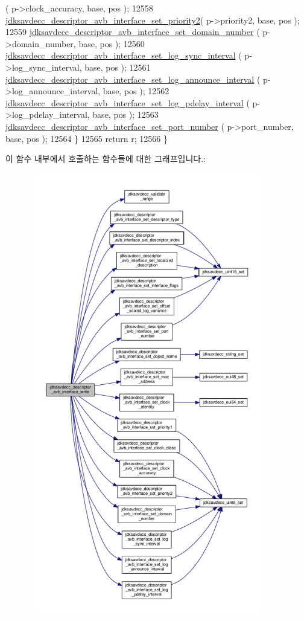 \begin{DoxyCode}
      ( p->clock\_accuracy, base, pos );
12558         \hyperlink{group__descriptor__avb__interface_ga3c7cf7ee22623519b430421f9f3d21ac}{jdksavdecc\_descriptor\_avb\_interface\_set\_priority2}(
       p->priority2, base, pos );
12559         \hyperlink{group__descriptor__avb__interface_ga8cbb9a1d823c845467459787ed0cf496}{jdksavdecc\_descriptor\_avb\_interface\_set\_domain\_number}
      ( p->domain\_number, base, pos );
12560         \hyperlink{group__descriptor__avb__interface_ga94084d67afa2951894f33ccd3f286ae9}{jdksavdecc\_descriptor\_avb\_interface\_set\_log\_sync\_interval}
      ( p->log\_sync\_interval, base, pos );
12561         \hyperlink{group__descriptor__avb__interface_ga25f2b3d63e3f76a8ab2a3e4d5eb5e49c}{jdksavdecc\_descriptor\_avb\_interface\_set\_log\_announce\_interval}
      ( p->log\_announce\_interval, base, pos );
12562         \hyperlink{group__descriptor__avb__interface_gae9e1e30f57877348c69324957addd1ad}{jdksavdecc\_descriptor\_avb\_interface\_set\_log\_pdelay\_interval}
      ( p->log\_pdelay\_interval, base, pos );
12563         \hyperlink{group__descriptor__avb__interface_ga0237cacbfaaadf08e45a7e712a0fe5ba}{jdksavdecc\_descriptor\_avb\_interface\_set\_port\_number}
      ( p->port\_number, base, pos );
12564     \}
12565     \textcolor{keywordflow}{return} r;
12566 \}
\end{DoxyCode}


이 함수 내부에서 호출하는 함수들에 대한 그래프입니다.\+:
\nopagebreak
\begin{figure}[H]
\begin{center}
\leavevmode
\includegraphics[height=550pt]{group__descriptor__avb__interface_gada599ed47baa3ae5364320348034128f_cgraph}
\end{center}
\end{figure}


